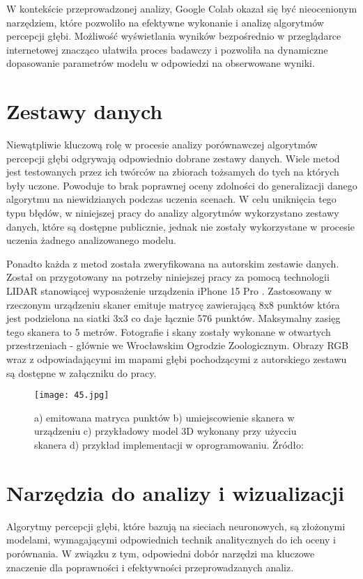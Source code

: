 W kontekście przeprowadzonej analizy, Google Colab okazał się być nieocenionym narzędziem, które pozwoliło na efektywne wykonanie i analizę algorytmów percepcji głębi. Możliwość wyświetlania wyników bezpośrednio w przeglądarce internetowej znacząco ułatwiła proces badawczy i pozwoliła na dynamiczne dopasowanie parametrów modelu w odpowiedzi na obserwowane wyniki.

\section{Zestawy danych}
Niewątpliwie kluczową rolę w procesie analizy porównawczej algorytmów percepcji głębi odgrywają odpowiednio dobrane zestawy danych. Wiele metod jest testowanych przez ich twórców na zbiorach tożsamych do tych na których były uczone. Powoduje to brak poprawnej oceny zdolności do generalizacji danego algorytmu na niewidzianych podczas uczenia scenach. W celu uniknięcia tego typu błędów, w niniejszej pracy do analizy algorytmów wykorzystano zestawy danych, które są dostępne publicznie, jednak nie zostały wykorzystane w procesie uczenia żadnego analizowanego modelu.

Ponadto każda z metod została zweryfikowana na autorskim zestawie danych. Został on przygotowany na potrzeby niniejszej pracy za pomocą technologii LIDAR stanowiącej wyposażenie urządzenia iPhone 15 Pro \cite{chase2022apple}. Zastosowany w rzeczonym urządzeniu skaner emituje matrycę zawierającą 8x8 punktów która jest podzielona na siatki 3x3 co daje łącznie 576 punktów. Maksymalny zasięg tego skanera to 5 metrów. Fotografie i skany zostały wykonane w otwartych przestrzeniach - głównie we Wrocławskim Ogrodzie Zoologicznym. Obrazy RGB wraz z odpowiadającymi im mapami głębi pochodzącymi z autorskiego zestawu są dostępne w załączniku do pracy.
\begin{figure}[H]
    \centering
    \texttt{[image: 45.jpg]}
    \caption{a) emitowana matryca punktów b) umiejscowienie skanera w urządzeniu c) przykładowy model 3D wykonany przy użycciu skanera d) przykład implementacji w oprogramowaniu. Źródło: \cite{luetzenburg2021evaluation}}
    \label{fig:iphone-lidar}
\end{figure}

\section{Narzędzia do analizy i wizualizacji}
Algorytmy percepcji głębi, które bazują na sieciach neuronowych, są złożonymi modelami, wymagającymi odpowiednich technik analitycznych do ich oceny i porównania. W związku z tym, odpowiedni dobór narzędzi ma kluczowe znaczenie dla poprawności i efektywności przeprowadzanych analiz.

